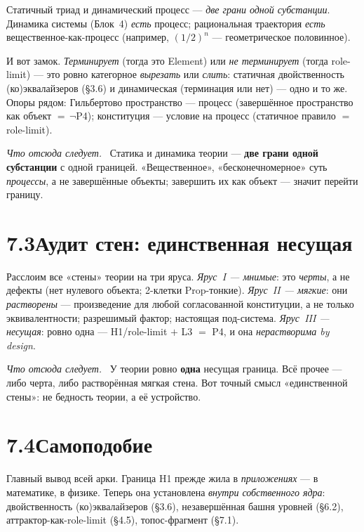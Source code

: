 \documentclass[12pt,a4paper]{article}
\newcommand{\rezultat}{\medskip\noindent\emph{Что отсюда следует.}\ }
\begin{document}
{\sloppy
Статичный триад и динамический процесс --- \emph{две грани одной субстанции}. Динамика системы
(Блок~4) \emph{есть} процесс; рациональная траектория \emph{есть} вещественное-как-процесс
(например, $(1/2)^n$ --- геометрическое половинное).

И вот замок. \emph{Терминирует} (тогда это Element) или \emph{не терминирует} (тогда role-limit) ---
это ровно категорное \emph{вырезать} или \emph{слить}: статичная двойственность (ко)эквалайзеров
(§3.6) и динамическая (терминация или нет) --- одно и то же. Опоры рядом: Гильбертово пространство ---
процесс (завершённое пространство как объект $=\,\neg$P4); конституция --- условие на процесс
(статичное правило $=$ role-limit).\par}

\rezultat
Статика и динамика теории --- \textbf{две грани одной субстанции} с одной границей. «Вещественное»,
«бесконечномерное» суть \emph{процессы}, а не завершённые объекты; завершить их как объект ---
значит перейти границу.

\section*{7.3\quad Аудит стен: единственная несущая}

Расслоим все «стены» теории на три яруса. \emph{Ярус~I --- мнимые}: это \emph{черты}, а не дефекты
(нет нулевого объекта; 2-клетки Prop-тонкие). \emph{Ярус~II --- мягкие}: они \emph{растворены} ---
произведение для любой согласованной конституции, а не только эквивалентности; разрешимый фактор;
настоящая под-система. \emph{Ярус~III --- несущая}: ровно одна --- H1/role-limit $+$ L3 $=$ P4, и она
\emph{нерастворима by design}.

\rezultat
У теории ровно \textbf{одна} несущая граница. Всё прочее --- либо черта, либо растворённая мягкая
стена. Вот точный смысл «единственной стены»: не бедность теории, а её устройство.

\section*{7.4\quad Самоподобие}

Главный вывод всей арки. Граница H1 прежде жила в \emph{приложениях} --- в математике, в физике.
Теперь она установлена \emph{внутри собственного ядра}: двойственность (ко)эквалайзеров (§3.6),
незавершённая башня уровней (§6.2), аттрактор-как-role-limit (§4.5), топос-фрагмент (§7.1).
\end{document}
